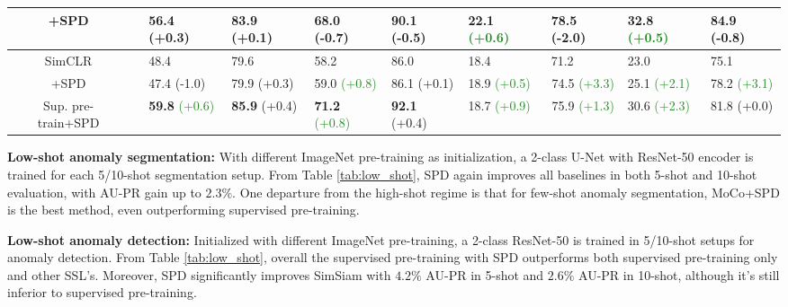 \documentclass[runningheads]{llncs}
\newcommand{\cmark}{\ding{51}}\newcommand{\xmark}{\ding{55}}\usepackage[colorlinks]{hyperref}
\begin{document}
\begin{table*}[!t]
{\begin{tabular}{c|c|llll||llll}
    +SPD               &   \xmark                                                                         & 56.4 (+0.3) & \multicolumn{1}{l|}{83.9 (+0.1)} & 68.0 (-0.7)   & 90.1 (-0.5)  & \textbf{22.1} \textcolor{forestgreen}{(+0.6)} & \multicolumn{1}{l|}{78.5 (-2.0)} & \textbf{32.8} \textcolor{forestgreen}{(+0.5)}  & 84.9 (-0.8)  \\ \hline 
    SimCLR             &  \xmark                                                                          & 48.4        & \multicolumn{1}{l|}{79.6}        & 58.2          & 86.0         & 18.4        & \multicolumn{1}{l|}{71.2}        & 23.0         & 75.1         \\
    +SPD               &  \xmark                                                                         & 47.4 (-1.0) & \multicolumn{1}{l|}{79.9 (+0.3)} & 59.0 \textcolor{forestgreen}{(+0.8)}   & 86.1 (+0.1)  & 18.9 \textcolor{forestgreen}{(+0.5)} & \multicolumn{1}{c|}{74.5 \textcolor{forestgreen}{(+3.3)}} & 25.1 \textcolor{forestgreen}{(+2.1)}  & 78.2 \textcolor{forestgreen}{(+3.1)}  \\ \hline
    Sup. pre-train+SPD &  \cmark                                                                          &    \textbf{59.8} \textcolor{forestgreen}{(+0.6)}         & \multicolumn{1}{l|}{\textbf{85.9} (+0.4)}            &         \textbf{71.2} \textcolor{forestgreen}{(+0.8)}      &   \textbf{92.1} (+0.4)          & 18.7 \textcolor{forestgreen}{(+0.9)} & \multicolumn{1}{c|}{75.9 \textcolor{forestgreen}{(+1.3)}} & 30.6 \textcolor{forestgreen}{(+2.3)}  & 81.8 (+0.0)  \\ \hline
    \end{tabular}}
\end{table*}

\noindent\textbf{Low-shot anomaly segmentation:} With different ImageNet pre-training as initialization, a 2-class U-Net with ResNet-50 encoder is trained for each 5/10-shot segmentation setup. From Table \ref{tab:low_shot}, SPD again improves all baselines in both 5-shot and 10-shot evaluation, with AU-PR gain up to $2.3\%$. One departure from the high-shot regime is that for few-shot anomaly segmentation, MoCo+SPD is the best method, even outperforming supervised pre-training.   

\noindent\textbf{Low-shot anomaly detection:} Initialized with different ImageNet pre-training, a 2-class ResNet-50 is trained in 5/10-shot setups for anomaly detection. From Table \ref{tab:low_shot}, overall the supervised pre-training with SPD outperforms both supervised pre-training only and other SSL's. Moreover, SPD significantly improves SimSiam with $4.2\%$ AU-PR in 5-shot and $2.6\%$ AU-PR in 10-shot, although it's still inferior to supervised pre-training.
\end{document}

